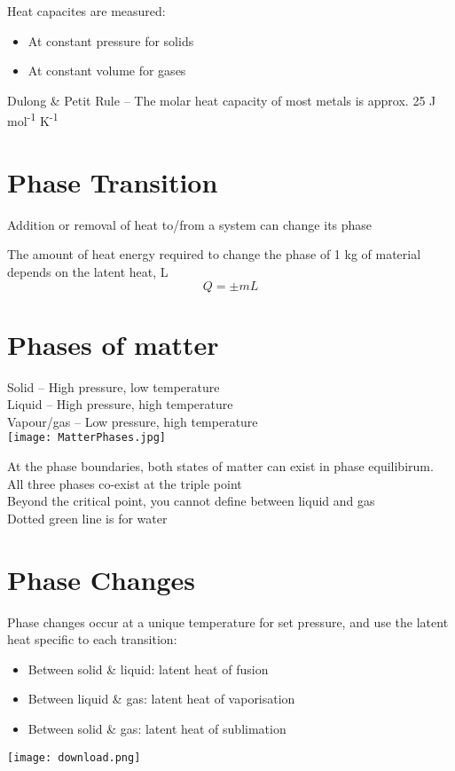 \documentclass[a4paper, 11pt, fleqn, normalem]{report}
\begin{document}
Heat capacites are measured:
\begin{itemize}
    \item[] At constant pressure for solids
    \item[] At constant volume for gases
\end{itemize}
Dulong \& Petit Rule -- The molar heat capacity of most metals is approx. 25 J mol\textsuperscript{-1} K\textsuperscript{-1}

\section{Phase Transition}
Addition or removal of heat to/from a system can change its phase

The amount of heat energy required to change the phase of 1 kg of material depends on the latent heat, L
\begin{equation*}
    Q = \pm mL
\end{equation*}

\section{Phases of matter}
Solid -- High pressure, low temperature \\
Liquid -- High pressure, high temperature \\
Vapour/gas -- Low pressure, high temperature \\
\texttt{[image: MatterPhases.jpg]}

At the phase boundaries, both states of matter can exist in phase equilibirum. \\
All three phases co-exist at the triple point \\
Beyond the critical point, you cannot define between liquid and gas \\
Dotted green line is for water

\section{Phase Changes}
Phase changes occur at a unique temperature for set pressure, and use the latent heat specific to each transition:
\begin{itemize}
    \item[] Between solid \& liquid: latent heat of fusion
    \item[] Between liquid \& gas: latent heat of vaporisation
    \item[] Between solid \& gas: latent heat of sublimation
\end{itemize}
\texttt{[image: download.png]}
\end{document}
